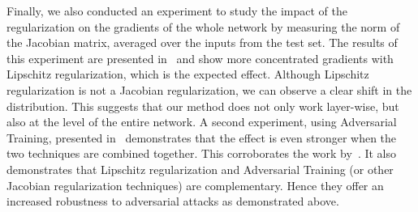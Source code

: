 Finally, we also conducted an experiment to study the impact of the regularization on the gradients of the whole network by measuring the norm of the Jacobian matrix, averaged over the inputs from the test set.
The results of this experiment are presented in~ and show more concentrated gradients with  Lipschitz regularization, which is the expected effect.
Although Lipschitz regularization is not a Jacobian regularization, we can observe a clear shift in the distribution.
This suggests that our method does not only work layer-wise, but also at the level of the entire network.
A second experiment, using Adversarial Training, presented in~ demonstrates that the effect is even stronger when the two techniques are combined together.
This corroborates the work by~\citet{farnia2018generalizable}.
It also demonstrates that Lipschitz regularization and Adversarial Training (or other Jacobian regularization techniques) are complementary.
Hence they offer an increased robustness to adversarial attacks as demonstrated above.


